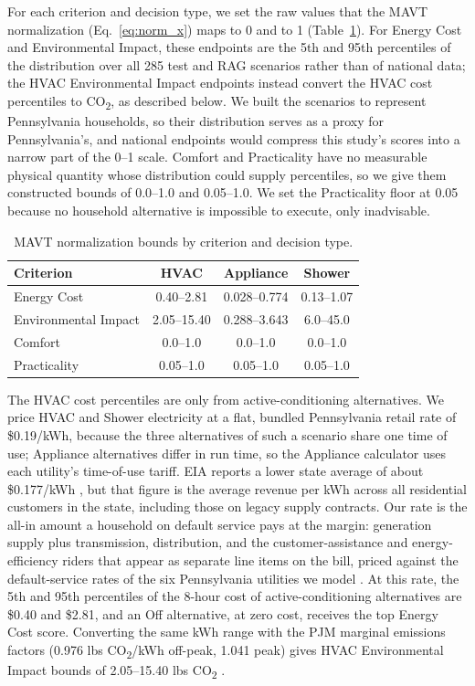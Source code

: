 \documentclass[final,3p,times]{elsarticle}
\begin{document}
For each criterion and decision type, we set the raw values that the MAVT normalization (Eq.~\ref{eq:norm_x}) maps to 0 and to 1 (Table~\ref{table:reference_ranges}). For Energy Cost and Environmental Impact, these endpoints are the 5th and 95th percentiles of the distribution over all 285 test and RAG scenarios rather than of national data; the HVAC Environmental Impact endpoints instead convert the HVAC cost percentiles to CO\textsubscript{2}, as described below. We built the scenarios to represent Pennsylvania households, so their distribution serves as a proxy for Pennsylvania's, and national endpoints would compress this study's scores into a narrow part of the 0--1 scale. Comfort and Practicality have no measurable physical quantity whose distribution could supply percentiles, so we give them constructed bounds of 0.0--1.0 and 0.05--1.0. We set the Practicality floor at 0.05 because no household alternative is impossible to execute, only inadvisable.

\begin{table}[htbp]
\caption{MAVT normalization bounds by criterion and decision type.}
\label{table:reference_ranges}
\centering
\begin{threeparttable}
\centering
\small
\begin{tabular}{@{}lccc@{}}
\toprule
\textbf{Criterion} & \textbf{HVAC} & \textbf{Appliance} & \textbf{Shower} \\
\midrule
Energy Cost & 0.40--2.81 & 0.028--0.774 & 0.13--1.07 \\
Environmental Impact & 2.05--15.40 & 0.288--3.643 & 6.0--45.0 \\
Comfort & 0.0--1.0 & 0.0--1.0 & 0.0--1.0 \\
Practicality & 0.05--1.0 & 0.05--1.0 & 0.05--1.0 \\
\bottomrule
\end{tabular}
\end{threeparttable}
\end{table}
The HVAC cost percentiles are only from active-conditioning alternatives. We price HVAC and Shower electricity at a flat, bundled Pennsylvania retail rate of \$0.19/kWh, because the three alternatives of such a scenario share one time of use; Appliance alternatives differ in run time, so the Appliance calculator uses each utility's time-of-use tariff. EIA reports a lower state average of about \$0.177/kWh \cite{eia_epa_2024}, but that figure is the average revenue per kWh across all residential customers in the state, including those on legacy supply contracts. Our rate is the all-in amount a household on default service pays at the margin: generation supply plus transmission, distribution, and the customer-assistance and energy-efficiency riders that appear as separate line items on the bill, priced against the default-service rates of the six Pennsylvania utilities we model \cite{paupc2025}. At this rate, the 5th and 95th percentiles of the 8-hour cost of active-conditioning alternatives are \$0.40 and \$2.81, and an Off alternative, at zero cost, receives the top Energy Cost score. Converting the same kWh range with the PJM marginal emissions factors (0.976 lbs CO\textsubscript{2}/kWh off-peak, 1.041 peak) gives HVAC Environmental Impact bounds of 2.05--15.40 lbs CO\textsubscript{2} \cite{pjm2022emissions}.
\end{document}
